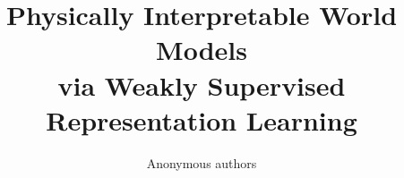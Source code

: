 \documentclass[sigconf]{acmart}
\begin{document}
\title{Physically Interpretable World Models \\ via Weakly Supervised Representation Learning}


\author{Anonymous authors
}







\renewcommand{\shortauthors}{Trovato et al.}
\end{document}
